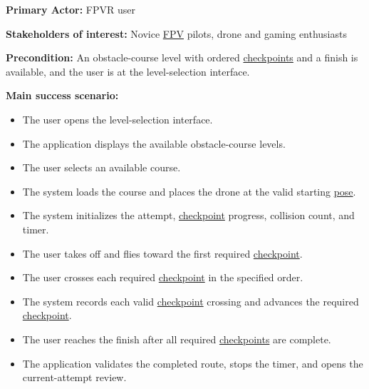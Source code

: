 \documentclass[12pt]{article}
\begin{document}
\begin{description}
\textbf{Primary Actor:} FPVR user

\textbf{Stakeholders of interest:} Novice \hyperlink{glos:FPV}{FPV} pilots, drone and gaming enthusiasts

\textbf{Precondition:} An obstacle-course level with ordered \hyperlink{glos:Checkpoint}{checkpoints} and a
finish is available, and the user is at the level-selection interface.

\textbf{Main success scenario:}
\begin{itemize}
\item The user opens the level-selection interface.
\item The application displays the available obstacle-course levels.
\item The user selects an available course.
\item The system loads the course and places the drone at the valid starting \hyperlink{glos:Tracking}{pose}.
\item The system initializes the attempt, \hyperlink{glos:Checkpoint}{checkpoint} progress, collision count, and
timer.
\item The user takes off and flies toward the first required \hyperlink{glos:Checkpoint}{checkpoint}.
\item The user crosses each required \hyperlink{glos:Checkpoint}{checkpoint} in the specified order.
\item The system records each valid \hyperlink{glos:Checkpoint}{checkpoint} crossing and advances the required
\hyperlink{glos:Checkpoint}{checkpoint}.
\item The user reaches the finish after all required \hyperlink{glos:Checkpoint}{checkpoints} are complete.
\item The application validates the completed route, stops the timer, and opens the
current-attempt review.
\end{itemize}


\end{description}
\end{document}
